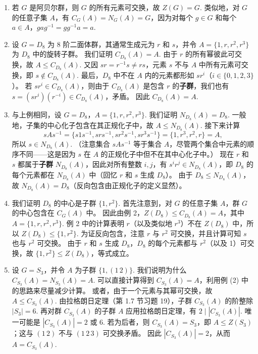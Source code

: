 \begin{example}
\begin{enumerate}[label=(\arabic*)]
\item 若 \( G \) 是阿贝尔群，则 \( G \) 的所有元素可交换，故 \( Z(G) = G \). 
类似地，对 \( G \) 的任意子集 \( A \)，有 \( C_G(A) = N_G(A) = G \)，因为对每个 \( g \in G \) 和每个 \( a \in A \)，\( gag^{-1} = gg^{-1}a = a \).

\item 设 \( G = D_8 \) 为 8 阶二面体群，其通常生成元为 \( r \) 和 \( s \)，并令 \( A = \{1, r, r^2, r^3\} \) 为 \( D_8 \) 中的旋转子群。
我们证明 \( C_{D_8}(A) = A \). 
由于 \( r \) 的所有幂彼此可交换，故 \( A \leq C_{D_8}(A) \). 
又因 \( sr = r^{-1}s \neq rs \)，元素 \( s \) 不与 \( A \) 中所有元素可交换，即 \( s \notin C_{D_8}(A) \). 
最后，\( D_8 \) 中不在 \( A \) 内的元素都形如 \( sr^i \)（\( i \in \{0,1,2,3\} \)）。
若 \( sr^i \in C_{D_8}(A) \)，则由于 \( C_{D_8}(A) \) 是包含 \( r \) 的\textbf{子群}，我们也有 \( s = (sr^i)(r^{-i}) \in C_{D_8}(A) \)，矛盾。
因此 \( C_{D_8}(A) = A \).

\item 与上例相同，设 \( G = D_8 \)，\( A = \{1, r, r^2, r^3\} \). 
我们证明 \( N_{D_8}(A) = D_8 \). 
一般地，子集的中心化子包含在其正规化子中，故 \( A \leq N_{D_8}(A) \). 
接下来计算
\[
sAs^{-1} = \{s1s^{-1}, srs^{-1}, sr^2s^{-1}, sr^3s^{-1}\} = \{1, r^3, r^2, r\} = A,
\]
所以 \( s \in N_{D_8}(A) \). 
（注意集合 \( sAs^{-1} \) 等于集合 \( A \)，尽管两个集合中元素的顺序不同——这是因为 \( s \) 在 \( A \) 的正规化子中但不在其中心化子中。）
现在 \( r \) 和 \( s \) 都属于\textbf{子群} \( N_{D_8}(A) \)，因此对所有整数 \( i, j \)，有 \( s^i r^j \in N_{D_8}(A) \)，即 \( D_8 \) 的每个元素都在 \( N_{D_8}(A) \) 中（回忆 \( r \) 和 \( s \) 生成 \( D_8 \)）。
由于 \( D_8 \leq N_{D_8}(A) \)，故 \( N_{D_8}(A) = D_8 \)（反向包含由正规化子的定义显然）。

\item 我们证明 \( D_8 \) 的中心是子群 \( \{1, r^2\} \). 
首先注意到，对 \( G \) 的任意子集 \( A \)，群 \( G \) 的中心包含在 \( C_G(A) \) 中。
因此由例 2，\( Z(D_8) \leq C_{D_8}(A) = A \)，其中 \( A = \{1, r, r^2, r^3\} \). 
例 2 中的计算表明 \( r \)（以及类似地 \( r^3 \)）不在 \( Z(D_8) \) 中，所以 \( Z(D_8) \leq \{1, r^2\} \). 
为证反向包含，注意 \( r \) 与 \( r^2 \) 可交换，并且计算可知 \( s \) 也与 \( r^2 \) 可交换。
由于 \( r \) 和 \( s \) 生成 \( D_8 \)，\( D_8 \) 的每个元素都与 \( r^2 \)（以及 1）可交换，故 \( \{1, r^2\} \leq Z(D_8) \)，等式成立。

\item 设 \( G = S_3 \)，并令 \( A \) 为子群 \( \{1, (1\,2)\} \). 
我们说明为什么 \( C_{S_3}(A) = N_{S_3}(A) = A \). 
可以直接计算得到 \( C_{S_3}(A) = A \)，利用例 (2) 中的思路来尽量减少计算。
或者，由于一个元素与其幂可交换，故 \( A \leq C_{S_3}(A) \). 
由拉格朗日定理（第 1.7 节习题 19），子群 \( C_{S_3}(A) \) 的阶整除 \( |S_3| = 6 \). 
再对群 \( C_{S_3}(A) \) 的子群 \( A \) 应用拉格朗日定理，有 \( 2 \mid |C_{S_3}(A)| \). 
唯一可能是 \( |C_{S_3}(A)| = 2 \) 或 6. 
若为后者，则 \( C_{S_3}(A) = S_3 \)，即 \( A \leq Z(S_3) \)；这与 \( (1\,2) \) 不与 \( (1\,2\,3) \) 可交换矛盾。
因此 \( |C_{S_3}(A)| = 2 \)，从而 \( A = C_{S_3}(A) \).


\end{enumerate}
\end{example}
